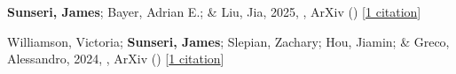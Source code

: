 \item \textbf{Sunseri, James}; Bayer, Adrian E.; \& Liu, Jia, 2025, , ArXiv () [\href{https://ui.adsabs.harvard.edu/abs/2025arXiv250311778S}{1 citation}]

\item Williamson, Victoria; \textbf{Sunseri, James}; Slepian, Zachary; Hou, Jiamin; \& Greco, Alessandro, 2024, , ArXiv () [\href{https://ui.adsabs.harvard.edu/abs/2024arXiv241203967W}{1 citation}]